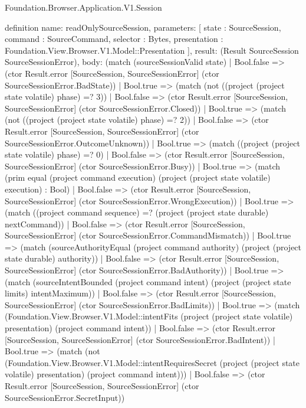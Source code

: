 \begin{lexlean}{Foundation.Browser.Application.V1.Session}
\begin{semanticmodule}
definition{
  name: readOnlySourceSession,
  parameters: [
    state : SourceSession,
    command : SourceCommand,
    selector : Bytes,
    presentation : Foundation.View.Browser.V1.Model::Presentation
  ],
  result: (Result SourceSession SourceSessionError),
  body: (match (sourceSessionValid state)
    | Bool.false => (ctor Result.error [SourceSession, SourceSessionError] (ctor SourceSessionError.BadState))
    | Bool.true => (match (not ((project (project state volatile) phase) =? 3))
      | Bool.false => (ctor Result.error [SourceSession, SourceSessionError] (ctor SourceSessionError.Closed))
      | Bool.true => (match (not ((project (project state volatile) phase) =? 2))
        | Bool.false => (ctor Result.error [SourceSession, SourceSessionError] (ctor SourceSessionError.OutcomeUnknown))
        | Bool.true => (match ((project (project state volatile) phase) =? 0)
          | Bool.false => (ctor Result.error [SourceSession, SourceSessionError] (ctor SourceSessionError.Busy))
          | Bool.true => (match (prim equal (project command execution) (project (project state volatile) execution) : Bool)
            | Bool.false => (ctor Result.error [SourceSession, SourceSessionError] (ctor SourceSessionError.WrongExecution))
            | Bool.true => (match ((project command sequence) =? (project (project state durable) nextCommand))
              | Bool.false => (ctor Result.error [SourceSession, SourceSessionError] (ctor SourceSessionError.CommandMismatch))
              | Bool.true => (match (sourceAuthorityEqual (project command authority) (project (project state durable) authority))
                | Bool.false => (ctor Result.error [SourceSession, SourceSessionError] (ctor SourceSessionError.BadAuthority))
                | Bool.true => (match (sourceIntentBounded (project command intent) (project (project state limits) intentMaximum))
                  | Bool.false => (ctor Result.error [SourceSession, SourceSessionError] (ctor SourceSessionError.BadLimits))
                  | Bool.true => (match (Foundation.View.Browser.V1.Model::intentFits (project (project state volatile) presentation) (project command intent))
                    | Bool.false => (ctor Result.error [SourceSession, SourceSessionError] (ctor SourceSessionError.BadIntent))
                    | Bool.true => (match (not (Foundation.View.Browser.V1.Model::intentRequiresSecret (project (project state volatile) presentation) (project command intent)))
                      | Bool.false => (ctor Result.error [SourceSession, SourceSessionError] (ctor SourceSessionError.SecretInput))
}
\end{semanticmodule}
\end{lexlean}
